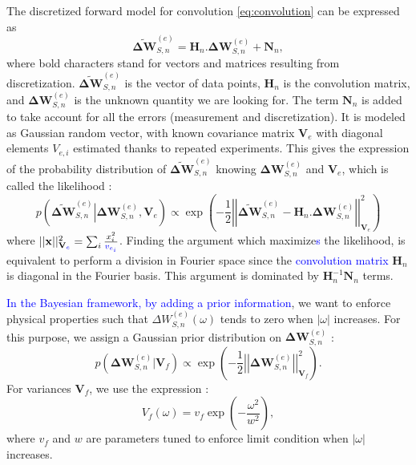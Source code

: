 \documentclass[aps,prb,superscriptaddress,preprint]{revtex4-1}
\begin{document}
	The discretized forward model for convolution \eqref{eq:convolution} can be expressed as
	\begin{equation}
	\widetilde{\mathbf{\Delta W}}^{(e)}_{S,n} = \mathbf{H}_{n}.\mathbf{\Delta W}^{(e)}_{S,n} + \mathbf{N}_{n},
	\end{equation}
	where bold characters stand for vectors and matrices resulting from discretization. $\widetilde{\mathbf{\Delta W}}^{(e)}_{S,n}$ is the vector of data points, $\mathbf{H}_{n}$ is the convolution matrix, and $\mathbf{\Delta W}^{(e)}_{S,n}$ is the unknown quantity we are looking for. The term $\mathbf{N}_{n}$ is added to take account for all the errors (measurement and discretization). It is modeled as Gaussian random vector, with known covariance matrix $\mathbf{V}_{e}$ with diagonal
	elements $V_{e,i}$ estimated thanks to repeated experiments.  This gives the expression of the probability distribution of $\widetilde{\mathbf{\Delta W}}^{(e)}_{S,n}$ knowing $\mathbf{\Delta W}^{(e)}_{S,n}$ and $\mathbf{V}_{e}$, which is called the likelihood :
	\begin{equation}
	p\left(\widetilde{\mathbf{\Delta W}}^{(e)}_{S,n}\left|\mathbf{\Delta W}^{(e)}_{S,n}, \mathbf{V}_{e} \right.\right)  \propto \exp\left(-\frac{1}{2}\left| \left| \widetilde{\mathbf{\Delta W}}^{(e)}_{S,n} - \mathbf{H}_{n}.\mathbf{\Delta W}^{(e)}_{S,n} \right| \right|^{2}_{\mathbf{V}_{e}}  \right)
	\label{likelihood}
	\end{equation}
	where $||\mathbf{x}||_{\mathbf{V}\textcolor{blue}{_{e}}}^{2}=\sum_i \frac{x_{i}^2}{\textcolor{blue}{v_{e_{i}}}}$. Finding the argument which maximize\textcolor{blue}{s} the likelihood, is equivalent to perform a division in Fourier space since the \textcolor{blue}{convolution matrix} $\mathbf{H}_{n}$ is diagonal in the Fourier basis. This argument is dominated by $\mathbf{H}^{-1}_{n}\mathbf{N}_{n}$ terms.
	
	\textcolor{blue}{In the Bayesian framework, by adding a prior information}, we want to enforce physical properties such that $\Delta W^{(e)}_{S,n}\left(\omega\right) $ tends to zero when $\left|\omega \right|$ increases. For this purpose, we assign a Gaussian prior distribution on $\mathbf{\Delta W}^{(e)}_{S,n}$ :
	\begin{equation}
	p\left( \mathbf{\Delta W}^{(e)}_{S,n}\left| \mathbf{V}_{f} \right.  \right)  \propto  \exp\left(-\frac{1}{2}\left| \left| \mathbf{\Delta W}^{(e)}_{S,n} \right| \right|^{2}_{\mathbf{V}_{f}}  \right).
	\label{prior}
	\end{equation}
	For variances $\mathbf{V}_{f}$, we use the expression :
	\begin{equation}
	V_{f}(\omega) = v_{f}\exp \left( -\frac{\omega^{2}}{w^{2}} \right),
	\label{eq:variances of delta w}
	\end{equation}
	where $v_f$ and $w$ are parameters tuned to enforce limit condition when $\left|\omega \right|$ increases.
	
\end{document}
